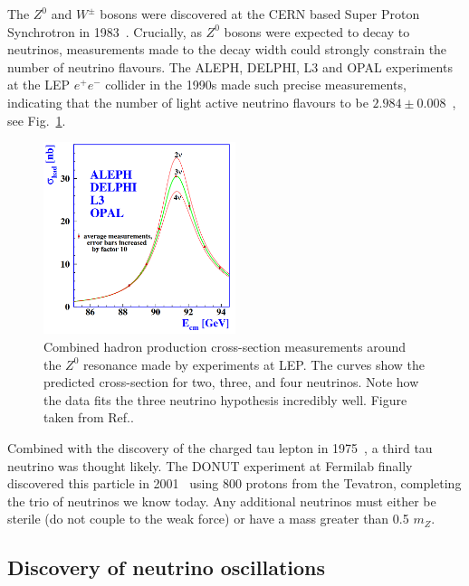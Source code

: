 The $Z^{0}$ and $W^{\pm}$ bosons were discovered at the CERN based Super Proton Synchrotron in
1983~\cite{arnison1983_z,arnison1983_w}. Crucially, as $Z^{0}$ bosons were expected to decay to
neutrinos, measurements made to the decay width could strongly constrain the number of neutrino
flavours. The ALEPH, DELPHI, L3 and OPAL experiments at the LEP $e^{+}e^{-}$ collider in the 1990s
made such precise measurements, indicating that the number of light active neutrino flavours to be
$2.984\pm0.008$~\cite{electroweak2006}, see Fig.~\ref{fig:z_resonance}.

\begin{figure} %
    \includegraphics[origin=c,width=0.5\textwidth]{diagrams/3-theory/z_resonance.png}
    \caption[Hadron production cross-section measurements from LEP]
    {Combined hadron production cross-section measurements around the $Z^{0}$ resonance made by
        experiments at LEP. The curves show the predicted cross-section for two, three, and four
        neutrinos. Note how the data fits the three neutrino hypothesis incredibly well. Figure
        taken from Ref.\cite{electroweak2006}.}
    \label{fig:z_resonance}
\end{figure}

Combined with the discovery of the charged tau lepton in 1975~\cite{perl1975}, a third tau
neutrino was thought likely. The DONUT experiment at Fermilab finally discovered this particle in
2001~\cite{Kodama2001} using \unit{800}{\GeV} protons from the Tevatron, completing the trio of
neutrinos we know today. Any additional neutrinos must either be sterile (do not couple to the
weak force) or have a mass greater than 0.5 $m_{Z}$.

\subsection{Discovery of neutrino oscillations} %
\label{sec:theory_history_osc} %

